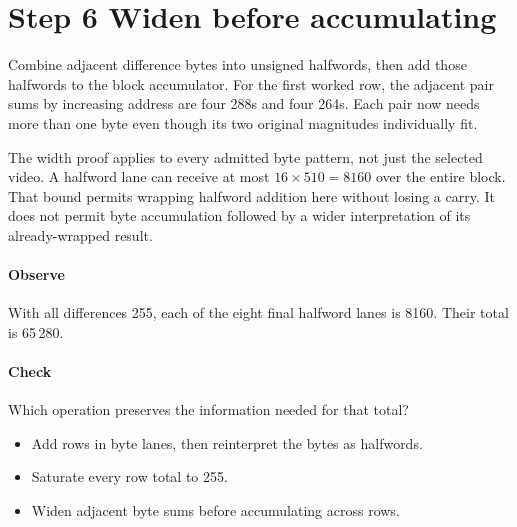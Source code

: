 \section{Step 6 Widen before accumulating}\label{h263-sad-s06}
Combine adjacent difference bytes into unsigned halfwords, then add those
halfwords to the block accumulator. For the first worked row, the adjacent pair
sums by increasing address are four 288s and four 264s. Each pair now needs more
than one byte even though its two original magnitudes individually fit.

The width proof applies to every admitted byte pattern, not just the selected
video. A halfword lane can receive at most $16\times510=8160$ over the entire
block. That bound permits wrapping halfword addition here without losing a carry.
It does not permit byte accumulation followed by a wider interpretation of its
already-wrapped result.

\paragraph{Observe} With all differences 255, each of the eight final halfword
lanes is 8160. Their total is 65\,280.
\paragraph{Check} Which operation preserves the information needed for that total?
\begin{itemize}
  \item[A.] Add rows in byte lanes, then reinterpret the bytes as halfwords.
  \item[B.] Saturate every row total to 255.
  \item[C.] Widen adjacent byte sums before accumulating across rows.
\end{itemize}
